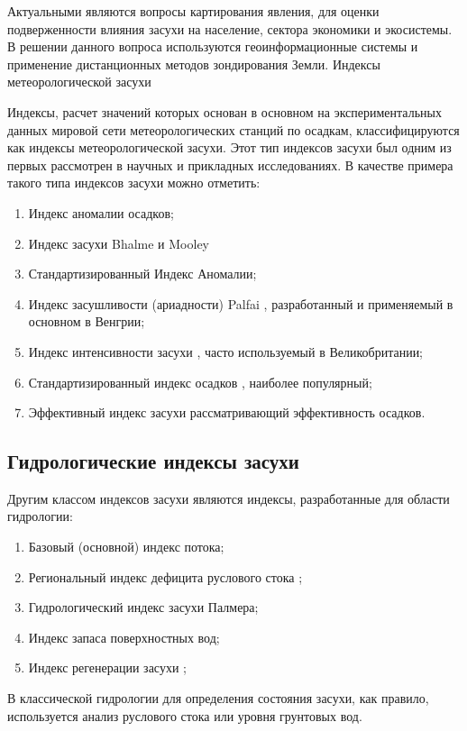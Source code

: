 Актуальными являются вопросы картирования явления, для оценки подверженности влияния засухи на население, сектора экономики и экосистемы. В решении данного вопроса используются геоинформационные системы и применение дистанционных методов зондирования Земли.
Индексы метеорологической засухи

Индексы, расчет значений которых основан в основном на экспериментальных данных мировой сети метеорологических станций по осадкам, классифицируются как индексы метеорологической засухи. Этот тип индексов засухи был одним из первых рассмотрен в научных и прикладных исследованиях. В качестве примера такого типа индексов засухи можно отметить:

\begin{enumerate}
	\item Индекс аномалии осадков;
	\item Индекс засухи Bhalme и Mooley
	\item Стандартизированный Индекс Аномалии;
	\item Индекс засушливости (ариадности) Palfai , разработанный и применяемый в основном в Венгрии;
	\item Индекс интенсивности засухи , часто используемый в Великобритании;
	\item Стандартизированный индекс осадков , наиболее популярный;
	\item Эффективный индекс засухи рассматривающий эффективность осадков.
\end{enumerate}

\subsection{Гидрологические индексы засухи}

Другим классом индексов засухи являются индексы, разработанные для области гидрологии:

\begin{enumerate}
	\item Базовый (основной) индекс потока;
	\item Региональный индекс дефицита руслового стока ;
	\item Гидрологический индекс засухи Палмера;
	\item Индекс запаса поверхностных вод;
	\item Индекс регенерации засухи ;
\end{enumerate}

В классической гидрологии для определения состояния засухи, как правило, используется анализ руслового стока или уровня грунтовых вод.

